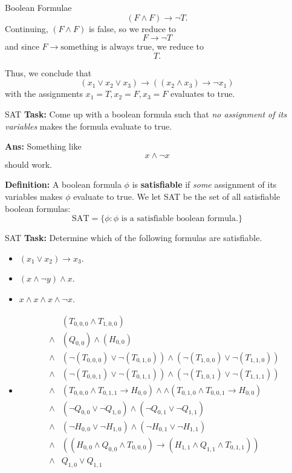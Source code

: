 \documentclass{beamer}
\begin{document}
\begin{frame}{Boolean Formulae}
$$(F \land F) \rightarrow \neg T.$$
Continuing, $(F \land F)$ is false, so we reduce to
$$F \rightarrow \neg T$$
and since $F \rightarrow \text{something}$ is always true, we reduce to
$$T.$$

Thus, we conclude that 
$$(x_1 \lor x_2 \lor x_3) \rightarrow ((x_2 \land x_3) \rightarrow \neg x_1)$$
with the assignments $x_1 = T, x_2 = F, x_3 = F$ evaluates to true.


\end{frame}

\begin{frame}{SAT}
\textbf{Task:} Come up with a boolean formula such that \textit{no assignment of its variables} makes the formula evaluate to true.

\pause

\textbf{Ans:} Something like
$$x \land \neg x$$
should work.

\pause \vspace{2mm}

\textbf{Definition:} A boolean formula $\phi$ is \textbf{satisfiable} if \textit{some} assignment of its variables makes $\phi$ evaluate to true. We let SAT be the set of all satisfiable boolean formulas:
$$\mathrm{SAT} = \{\phi: \text{$\phi$ is a satisfiable boolean formula.}\}$$

\end{frame}

\begin{frame}{SAT}
\textbf{Task:} Determine which of the following formulas are satisfiable.

\begin{itemize}
    \item $(x_1 \lor x_2) \rightarrow x_3$.
    \item $(x \land \neg y) \land x$.
    \item $x \land x \land x \land \neg x$.
    \item \begin{align*}
        &(T_{0, 0, 0} \land T_{1, 0, 0})\\
   \land&(Q_{0, 0}) \land (H_{0, 0})\\
   \land&(\neg(T_{0, 0, 0}) \lor \neg(T_{0, 1, 0})) \land (\neg(T_{1, 0, 0}) \lor \neg(T_{1, 1, 0}))\\
   \land&(\neg(T_{0, 0, 1}) \lor \neg(T_{0, 1, 1})) \land (\neg(T_{1, 0, 1}) \lor \neg(T_{1, 1, 1}))\\
   \land&(T_{0, 0, 0} \land T_{0, 1, 1} \rightarrow H_{0, 0}) \land \land(T_{0, 1, 0} \land T_{0, 0, 1} \rightarrow H_{0, 0})\\
   \land&(\neg Q_{0, 0} \lor \neg Q_{1, 0}) \land (\neg Q_{0, 1} \lor \neg Q_{1, 1})\\
   \land&(\neg H_{0, 0} \lor \neg H_{1, 0}) \land (\neg H_{0, 1} \lor \neg H_{1, 1})\\
   \land&((H_{0, 0} \land Q_{0, 0} \land T_{0, 0, 0}) \rightarrow (H_{1, 1} \land Q_{1, 1} \land T_{0, 1, 1}))\\
   \land&{Q_{1, 0} \lor Q_{1, 1}}
    \end{align*}
\end{itemize}

\end{frame}
\end{document}
